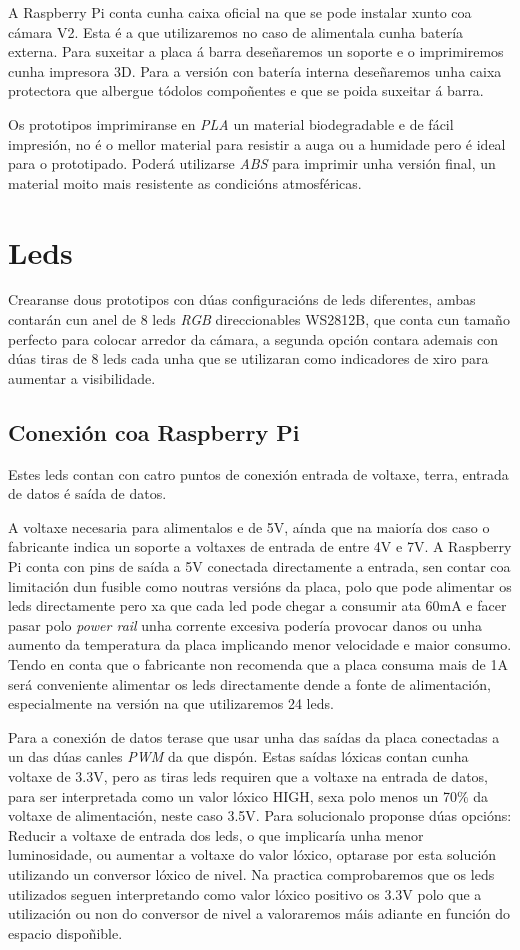 A Raspberry Pi conta cunha caixa oficial na que se pode instalar xunto coa cámara V2. Esta é a que utilizaremos no caso de alimentala cunha batería externa. Para suxeitar a placa á barra deseñaremos un soporte e o imprimiremos cunha impresora 3D. Para a versión con batería interna deseñaremos unha caixa protectora que albergue tódolos compoñentes e que se poida suxeitar á barra.

Os prototipos imprimiranse en \emph{PLA} un material biodegradable e de fácil impresión, no é o mellor material para resistir a auga ou a humidade pero é ideal para o prototipado. Poderá utilizarse \emph{ABS} para imprimir unha versión final, un material moito mais resistente as condicións atmosféricas.

\section{Leds}

Crearanse dous prototipos con dúas configuracións de leds diferentes, ambas contarán cun anel de 8 leds \emph{RGB} direccionables WS2812B, que conta cun tamaño perfecto para colocar arredor da cámara, a segunda opción contara ademais con dúas tiras de 8 leds cada unha que se utilizaran como indicadores de xiro para aumentar a visibilidade.
\subsection{Conexión coa Raspberry Pi}
Estes leds contan con catro puntos de conexión entrada de voltaxe, terra, entrada de datos é saída de datos.

A voltaxe necesaria para alimentalos e de 5V, aínda que na maioría dos caso o fabricante indica un soporte a voltaxes de entrada de entre 4V e 7V. A Raspberry Pi conta con pins de saída a 5V conectada directamente a entrada, sen contar coa limitación dun fusible como noutras versións da placa, polo que pode alimentar os leds directamente pero xa que cada led pode chegar a consumir ata 60mA e facer pasar polo \emph{power rail} unha corrente excesiva podería provocar danos ou unha aumento da temperatura da placa implicando menor velocidade e maior consumo. Tendo en conta que o fabricante non recomenda que a placa consuma mais de 1A será conveniente alimentar os leds directamente dende a fonte de alimentación, especialmente na versión na que utilizaremos 24 leds.

Para a conexión de datos terase que usar unha das saídas da placa conectadas a un das dúas canles \emph{PWM} da que dispón. Estas saídas lóxicas contan cunha voltaxe de 3.3V, pero as tiras leds requiren que a voltaxe na entrada de datos, para ser interpretada como un valor lóxico HIGH, sexa polo menos un 70\(\%\) da  voltaxe de alimentación, neste caso 3.5V. Para solucionalo proponse dúas opcións: Reducir a voltaxe de entrada dos leds, o que implicaría unha menor luminosidade, ou aumentar a voltaxe do valor lóxico, optarase por esta solución utilizando un conversor lóxico de nivel. Na practica comprobaremos que os leds utilizados seguen interpretando como valor lóxico positivo os 3.3V polo que a utilización ou non do conversor de nivel a valoraremos máis adiante en función do espacio dispoñible.

